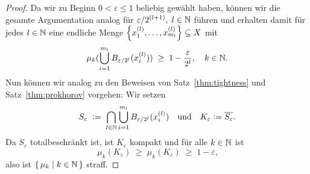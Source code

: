 \documentclass[../main/main.tex]{subfiles}
\begin{document}
\begin{proof}
		Da wir zu Beginn $0 < \varepsilon \leq 1$ beliebig gewählt haben, können wir die gesamte Argumentation analog für $\varepsilon/2^{(l+1)}, \; l \in \mathbb{N}$ führen und erhalten damit für jedes $l \in \mathbb{N}$ 
		eine endliche Menge $\left\{x_1^{(l)}, \dots, x_{m_l}^{(l)}\right\} \subseteq X$ mit
		\[ \mu_k(\bigcup_{i=1}^{m_l} B_{\varepsilon/2^l}(x_i^{(l)})) \; \geq \; 1 - \frac{\varepsilon}{2^l}, \quad k \in \mathbb{N} \text{.} \]
		Nun können wir analog zu den Beweisen von Satz~\ref{thm:tightness} und Satz~\ref{thm:prokhorov} vorgehen:
		Wir setzen
		\[ S_{\varepsilon} \; \vcentcolon = \; \bigcap_{l \in \mathbb{N}} \bigcup_{i=1}^{m_l} B_{\varepsilon/2^l}(x_i^{(l)}) \quad \text{und} \quad K_{\varepsilon} \vcentcolon = \overline{S_\varepsilon} \text{.} \]
		Da $S_{\varepsilon}$ totalbeschränkt ist, ist $K_{\varepsilon}$ kompakt und für alle $k \in \mathbb{N}$ ist
		\[ \mu_k(K_{\varepsilon}) \; \geq \; \mu_k(K_{\varepsilon}) \; \geq \; 1 - \varepsilon \text{,} \]
		also ist $\left\{\, \mu_k \; \middle| \; k \in \mathbb{N} \,\right\}$ straff.
	\end{proof}
	
\end{document}
